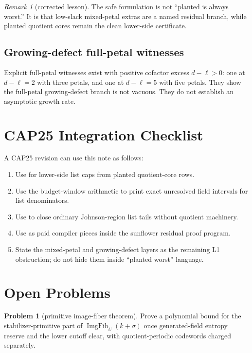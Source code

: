 \documentclass[11pt]{article}
\theoremstyle{definition}
\newtheorem{problem}[theorem]{Problem}
\theoremstyle{remark}
\newtheorem{remark}[theorem]{Remark}
\newcommand{\ImgFib}{\operatorname{ImgFib}}
\begin{document}
\begin{remark}[corrected lesson]
The safe formulation is not ``planted is always worst.''  It is that
low-slack mixed-petal extras are a named residual branch, while planted
quotient cores remain the clean lower-side certificate.
\end{remark}

\subsection{Growing-defect full-petal witnesses}

Explicit full-petal witnesses exist with positive cofactor excess
$d-\ell>0$: one at $d-\ell=2$ with three petals, and one at $d-\ell=5$ with
five petals.  They show the full-petal growing-defect branch is not vacuous.
They do not establish an asymptotic growth rate.

\section{CAP25 Integration Checklist}

A CAP25 revision can use this note as follows:
\begin{enumerate}[label=(\arabic*)]
        \item Use  for
        lower-side list caps from planted quotient-core rows.
        \item Use the budget-window arithmetic to print exact unresolved field
        intervals for list denominators.
        \item Use  to close ordinary Johnson-region list
        tails without quotient machinery.
        \item Use  as paid
        compiler pieces inside the sunflower residual proof program.
        \item State the mixed-petal and growing-defect layers as the remaining
        L1 obstruction; do not hide them inside ``planted worst'' language.
\end{enumerate}

\section{Open Problems}

\begin{problem}[primitive image-fiber theorem]
Prove a polynomial bound for the stabilizer-primitive part of
$\ImgFib_U(k+\sigma)$ once generated-field entropy reserve and the lower cutoff
clear, with quotient-periodic codewords charged separately.
\end{problem}
\end{document}
